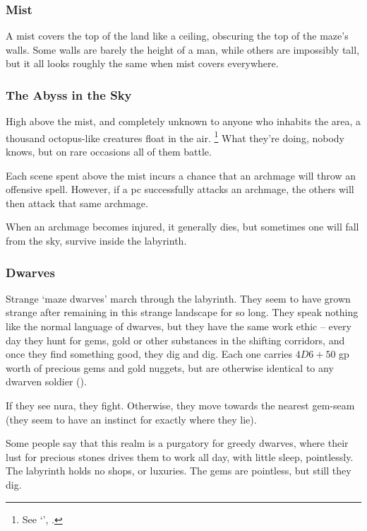 \begin{multicols}{2}
\subsubsection{Mist}

A mist covers the top of the land like a ceiling, obscuring the top of the maze's walls.
Some walls are barely the height of a man, while others are impossibly tall, but it all looks roughly the same when mist covers everywhere.

\subsubsection{The Abyss in the Sky}

High above the mist, and completely unknown to anyone who inhabits the area, a thousand octopus-like creatures float in the air.
\footnote{See `', .}
What they're doing, nobody knows, but on rare occasions all of them battle.

Each scene spent above the mist incurs a chance that an archmage will throw an offensive spell.
However, if a \gls{pc} successfully attacks an archmage, the others will then attack that same archmage.

When an archmage becomes injured, it generally dies, but sometimes one will fall from the sky, survive inside the labyrinth.

\subsubsection{Dwarves}

Strange `maze dwarves' march through the labyrinth.
They seem to have grown strange after remaining in this strange landscape for so long.
They speak nothing like the normal language of dwarves, but they have the same work ethic -- every day they hunt for gems, gold or other substances in the shifting corridors, and once they find something good, they dig and dig.
Each one carries $4D6 + 50$ gp worth of precious gems and gold nuggets, but are otherwise identical to any dwarven soldier ().

If they see nura, they fight.
Otherwise, they move towards the nearest gem-seam (they seem to have an instinct for exactly where they lie).

Some people say that this realm is a purgatory for greedy dwarves, where their lust for precious stones drives them to work all day, with little sleep, pointlessly.
The labyrinth holds no shops, or luxuries.
The gems are pointless, but still they dig.


\end{multicols}
